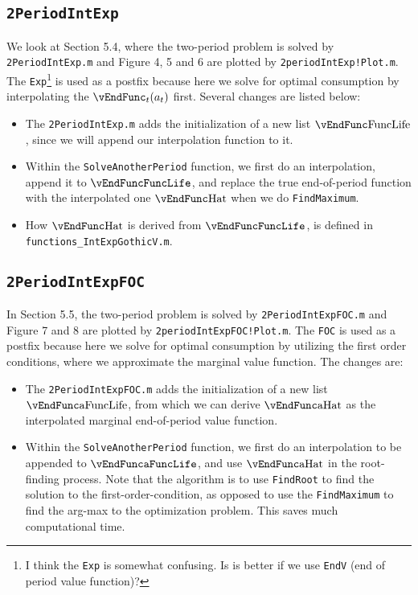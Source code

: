 \documentclass[titlepage,abstract]{\econtex}
\begin{document}
\subsection{\texttt{2PeriodIntExp}}
We look at Section 5.4, where the two-period problem is solved by \texttt{2PeriodIntExp.m} and Figure 4, 5 and 6 are plotted by \texttt{2periodIntExp!Plot.m}. The \texttt{Exp}\footnote{I think the \texttt{Exp} is somewhat confusing. Is is better if we use \texttt{EndV} (end of period value function)?} is used as a postfix because here we solve for optimal consumption by interpolating the $\vEndFunc_{t}(a_{t})$ first. Several changes are listed below:
\begin{itemize}
\item The \texttt{2PeriodIntExp.m} adds the initialization of a new list $\vEndFunc\text{FuncLife}$, since we will append our interpolation function to it.
\item Within the \texttt{SolveAnotherPeriod} function, we first do an interpolation, append it to $\vEndFunc\texttt{FuncLife}$, and replace the true end-of-period function with the interpolated one $\vEndFunc\text{Hat}$ when we do \texttt{FindMaximum}.
\item How $\vEndFunc\text{Hat}$ is derived from $\vEndFunc\texttt{FuncLife}$, is defined in \texttt{functions\_IntExpGothicV.m}.
\end{itemize}

\subsection{\texttt{2PeriodIntExpFOC}}
In Section 5.5, the two-period problem is solved by \texttt{2PeriodIntExpFOC.m} and Figure 7 and 8 are plotted by \texttt{2periodIntExpFOC!Plot.m}. The \texttt{FOC} is used as a postfix because here we solve for optimal consumption by utilizing the first order conditions, where we approximate the marginal value function. The changes are:

\begin{itemize}
\item The \texttt{2PeriodIntExpFOC.m} adds the initialization of a new list $\vEndFunc\text{aFuncLife}$, from which we can derive $\vEndFunc\text{aHat}$ as the interpolated marginal end-of-period value function.
\item Within the \texttt{SolveAnotherPeriod} function, we first do an interpolation to be appended to $\vEndFunc\texttt{aFuncLife}$, and use $\vEndFunc\text{aHat}$ in the root-finding process. Note that the algorithm is to use \texttt{FindRoot} to find the solution to the first-order-condition, as opposed to use the \texttt{FindMaximum} to find the arg-max to the optimization problem. This saves much computational time.
\end{itemize}
\end{document}
